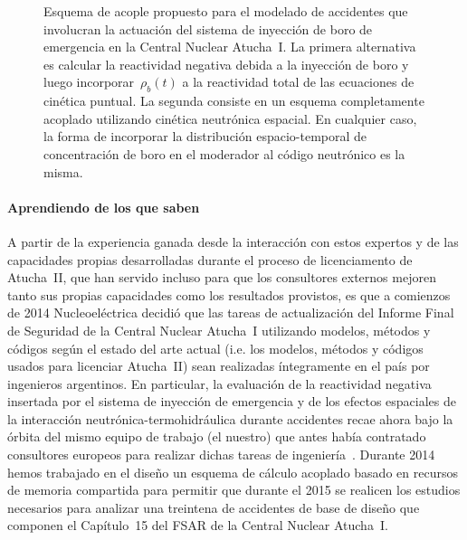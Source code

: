 \begin{figure}[p]
 \begin{center}

\vspace{2.5cm minus 1cm}

 \end{center}
\caption{\label{fig:acopleboro}Esquema de acople propuesto para el modelado de accidentes que involucran la actuación del sistema de inyección de boro de emergencia en la Central Nuclear Atucha~I. La primera alternativa es calcular la reactividad negativa debida a la inyección de boro y luego incorporar~$\rho_b(t)$ a la reactividad total de las ecuaciones de cinética puntual. La segunda consiste en un esquema completamente acoplado utilizando cinética neutrónica espacial. En cualquier caso, la forma de incorporar la distribución espacio-temporal de concentración de boro en el moderador al código neutrónico es la misma.}
\end{figure}


\paragraph{Aprendiendo de los que saben} A partir de la experiencia ganada desde la interacción con estos expertos y de las capacidades propias desarrolladas durante el proceso de licenciamento de Atucha~II, que han servido incluso para que los consultores externos mejoren tanto sus propias capacidades como los resultados provistos, es que a comienzos de 2014 Nucleoeléctrica decidió que las tareas de actualización del Informe Final de Seguridad de la Central Nuclear Atucha~I utilizando modelos, métodos y códigos según el estado del arte actual (i.e. los modelos, métodos y códigos usados para licenciar Atucha~II) sean realizadas íntegramente en el país por ingenieros argentinos. En particular, la evaluación de la reactividad negativa insertada por el sistema de inyección de emergencia y de los efectos espaciales de la interacción neutrónica-termohidráulica durante accidentes recae ahora bajo la órbita del mismo equipo de trabajo (el nuestro) que antes había contratado consultores europeos para realizar dichas 
tareas de ingeniería~\cite{ing2014-boro}. Durante 2014 hemos trabajado en el diseño un esquema de cálculo acoplado basado en recursos de memoria compartida para permitir que durante el 2015 se realicen los estudios necesarios para analizar una treintena de accidentes de base de diseño que componen el Capítulo~15 del FSAR de la Central Nuclear Atucha~I.


